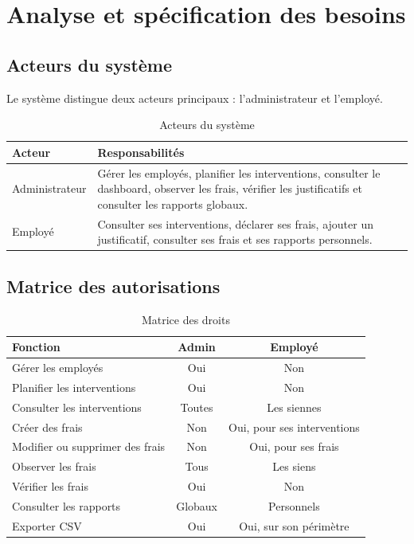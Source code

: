 \documentclass[12pt,a4paper,oneside]{report}
\begin{document}
\chapter{Analyse et spécification des besoins}
\section{Acteurs du système}
Le système distingue deux acteurs principaux : l'administrateur et l'employé.

\begin{table}[H]
\centering
\caption{Acteurs du système}
\begin{tabular}{p{4cm}p{9cm}}
\toprule
\textbf{Acteur} & \textbf{Responsabilités}\\
\midrule
Administrateur & Gérer les employés, planifier les interventions, consulter le dashboard, observer les frais, vérifier les justificatifs et consulter les rapports globaux.\\
Employé & Consulter ses interventions, déclarer ses frais, ajouter un justificatif, consulter ses frais et ses rapports personnels.\\
\bottomrule
\end{tabular}
\end{table}

\section{Matrice des autorisations}
\begin{table}[H]
\centering
\caption{Matrice des droits}
\begin{tabular}{p{5cm}cc}
\toprule
\textbf{Fonction} & \textbf{Admin} & \textbf{Employé}\\
\midrule
Gérer les employés & Oui & Non\\
Planifier les interventions & Oui & Non\\
Consulter les interventions & Toutes & Les siennes\\
Créer des frais & Non & Oui, pour ses interventions\\
Modifier ou supprimer des frais & Non & Oui, pour ses frais\\
Observer les frais & Tous & Les siens\\
Vérifier les frais & Oui & Non\\
Consulter les rapports & Globaux & Personnels\\
Exporter CSV & Oui & Oui, sur son périmètre\\
\bottomrule
\end{tabular}
\end{table}
\end{document}
